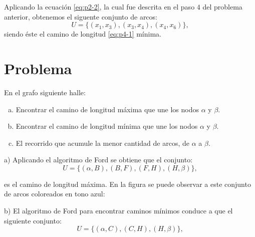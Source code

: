 \documentclass[autocontact]{gaceta}
\begin{document}
    
    
    \pagebreak
    Aplicando la ecuación \eqref{eq:p2-2}, la cual fue descrita en el paso $4$ del problema anterior, obtenemos el siguente conjunto de arcos:
    \begin{equation}\label{eq:p4-1}
        U = \{ (x_1, x_3), (x_3, x_4), (x_4, x_6)\},    
    \end{equation}
    siendo éste el camino de longitud \eqref{eq:p4-1} mínima.
    


\section{Problema}
    En el grafo siguiente halle:
    
    \begin{center}
        \begin{enumerate}[a)]
            \item Encontrar el camino de longitud máxima que une los nodos $\alpha$ y $\beta$.
            \item Encontrar el camino de longitud mínima que une los nodos $\alpha$ y $\beta$.
            \item El recorrido que acumule la menor cantidad de arcos, de $\alpha$ a $\beta$.
        \end{enumerate}
    \end{center}
    
    
    \pagebreak
    a) Aplicando el algoritmo de Ford se obtiene que el conjunto:
    \begin{equation}
        U = \{ (\alpha, B), (B, F), (F, H), (H, \beta) \},     
    \end{equation}
    
    es el camino de longitud máxima. En la figura se puede observar a este conjunto de arcos 
    coloreados en tono azul:

    


    b) El algoritmo de Ford para encontrar caminos mínimos conduce a que el siguiente conjunto:
    \begin{equation}
        U = \{ (\alpha, C), (C, H), (H, \beta) \},
    \end{equation}
    
\end{document}
